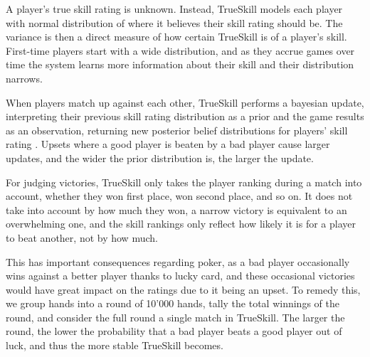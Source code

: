 A player's true skill rating is unknown. Instead, TrueSkill models each player with normal distribution of where it believes their skill rating should be. The variance is then a direct measure of how certain TrueSkill is of a player's skill. First-time players start with a wide distribution, and as they accrue games over time the system learns more information about their skill and their distribution narrows.

When players match up against each other, TrueSkill performs a bayesian update, interpreting their previous skill rating distribution as a prior and the game results as an observation, returning new posterior belief distributions for players' skill rating \cite{TrueSkill_original} \cite{TrueSkill_blog}. Upsets where a good player is beaten by a bad player cause larger updates, and the wider the prior distribution is, the larger the update.

For judging victories, TrueSkill only takes the player ranking during a match into account, whether they won first place, won second place, and so on. It does not take into account by how much they won, a narrow victory is equivalent to an overwhelming one, and the skill rankings only reflect how likely it is for a player to beat another, not by how much.

This has important consequences regarding poker, as a bad player occasionally wins against a better player  thanks to lucky card, and these occasional victories would have great impact on the ratings due to it being an upset. To remedy this, we group hands into a round of 10'000 hands, tally the total winnings of the round, and consider the full round a single match in TrueSkill. The larger the round, the lower the probability that a bad player beats a good player out of luck, and thus the more stable TrueSkill becomes.
